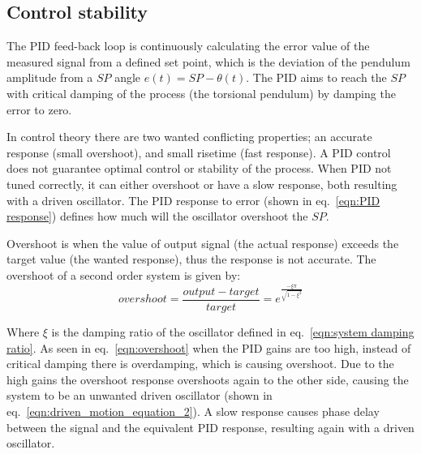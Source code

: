 \documentclass[\main/master.tex]{subfiles}
\begin{document}
\subsection{Control stability}
The PID feed-back loop is continuously calculating the error value of the measured signal from a defined set point, which is the deviation of the pendulum amplitude from a $SP$ angle $e(t) =SP -\theta(t) $. The PID aims to reach the $SP$ with critical damping of the process (the torsional pendulum) by damping the error to zero. 
\par\noindent
In control theory there are two wanted conflicting properties; an accurate response (small overshoot), and small risetime (fast response). A PID control does not guarantee optimal control or stability of the process. When PID not tuned correctly, it can either overshoot or have a slow response, both resulting with a driven oscillator. The PID response to error (shown in eq.~\ref{eqn:PID response}) defines how much will the oscillator overshoot the $SP$.
\par\noindent
Overshoot is when the value of output signal (the actual response) exceeds the target value (the wanted response), thus the response is not accurate. The overshoot of a second order system is given by:
\begin{equation}
overshoot =  \frac{output-target}{target} = e ^{\frac{-\xi\pi}{\sqrt{1-\xi^2}}}  \label{eqn:overshoot}
\end{equation}
\par\noindent
Where $\xi$ is the damping ratio of the oscillator defined in eq.~\ref{eqn:system damping ratio}. As seen in eq.~\ref{eqn:overshoot} when the PID gains are too high, instead of critical damping there is overdamping, which is causing overshoot. Due to the high gains the overshoot response overshoots again to the other side, causing the system to be an unwanted driven oscillator (shown in eq.~\ref{eqn:driven_motion_equation_2}). A slow response causes phase delay between the signal and the equivalent PID response, resulting  again with a driven oscillator.
\end{document}
